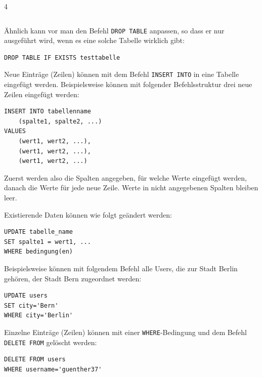 \begin{landscape}
\begin{multicols*}{4}
\begin{cheatSheetBox}[title={Überprüfen, ob existiert: \texorpdfstring{\lstinline|IF EXISTS|}{IF EXISTS}}]
\begin{lstlisting}
\end{lstlisting}
Ähnlich kann vor man den Befehl \lstinline|DROP TABLE| anpassen, so dass er nur ausgeführt wird, wenn es eine solche Tabelle wirklich gibt:
\begin{lstlisting}
DROP TABLE IF EXISTS testtabelle
\end{lstlisting}
\end{cheatSheetBox}

\begin{cheatSheetBox}[title=Daten einfügen: \texorpdfstring{\lstinline|INSERT INTO|}{INSERT INTO}]
Neue Einträge (Zeilen) können mit dem Befehl \lstinline|INSERT INTO| in eine Tabelle eingefügt werden. Beispielsweise können mit folgender Befehlsstruktur drei neue Zeilen eingefügt werden:
\begin{lstlisting}
INSERT INTO tabellenname 
	(spalte1, spalte2, ...)
VALUES 
	(wert1, wert2, ...),
	(wert1, wert2, ...),
	(wert1, wert2, ...)
\end{lstlisting}
Zuerst werden also die Spalten angegeben, für welche Werte eingefügt werden, danach die Werte für jede neue Zeile. Werte in nicht angegebenen Spalten bleiben leer.
\end{cheatSheetBox}

\begin{cheatSheetBox}[title=Daten verändern: \texorpdfstring{\lstinline|UPDATE|}{UPDATE}]
Existierende Daten können wie folgt geändert werden:
\begin{lstlisting}
UPDATE tabelle_name
SET spalte1 = wert1, ...
WHERE bedingung(en)
\end{lstlisting}

Beispielsweise können mit folgendem Befehl alle Users, die zur Stadt Berlin gehören, der Stadt Bern zugeordnet werden:

\begin{lstlisting}
UPDATE users
SET city='Bern'
WHERE city='Berlin'
\end{lstlisting}
\end{cheatSheetBox}

\begin{cheatSheetBox}[title=Einträge löschen: \texorpdfstring{\lstinline|DELETE FROM|}{DELETE FROM}]
Einzelne Einträge (Zeilen) können mit einer \lstinline|WHERE|-Bedingung und dem Befehl \lstinline|DELETE FROM| gelöscht werden:
\begin{lstlisting}
DELETE FROM users
WHERE username='guenther37'
\end{lstlisting}
\end{cheatSheetBox}


\end{multicols*}
\end{landscape}
